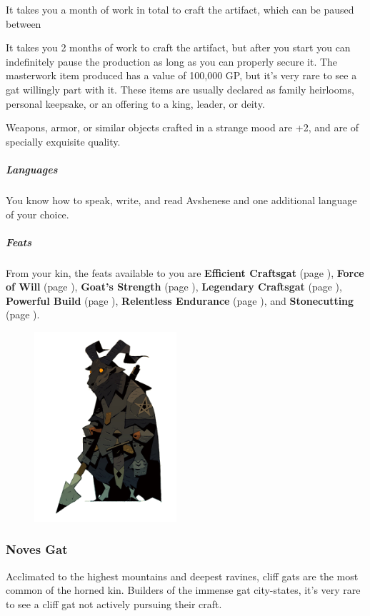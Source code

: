     It takes you a month of work in total to craft the artifact, which can be paused between

    It takes you 2 months of work to craft the artifact, but after you start you can indefinitely pause the production as long as you can properly secure it.
    The masterwork item produced has a value of 100,000 GP, but it's very rare to see a gat willingly part with it.
    These items are usually declared as family heirlooms, personal keepsake, or an offering to a king, leader, or deity.

    Weapons, armor, or similar objects crafted in a strange mood are +2, and are of specially exquisite quality.

    \subparagraph{Languages} You know how to speak, write, and read Avshenese and one additional language of your choice.

    \subparagraph{Feats} From your kin, the feats available to you are
    \textbf{Efficient Craftsgat} (page \pageref{feat::efficientcraftsgat}),
    \textbf{Force of Will} (page \pageref{feat::forceofwill}),
    \textbf{Goat's Strength} (page \pageref{feat::goatsstrength}),
    \textbf{Legendary Craftsgat} (page \pageref{feat::legendarycraftsgat}),
    \textbf{Powerful Build} (page \pageref{feat::powerfulbuild}),
    \textbf{Relentless Endurance} (page \pageref{feat::relentlessendurance}), and
    \textbf{Stonecutting} (page \pageref{feat::stonecutting}).

\begin{figure}[!b]
    \centering
    \includegraphics[width=0.47\textwidth]{04kins/img/11gat_knight.png}
\end{figure}

\newpage

\subsubsection{Noves Gat}
    Acclimated to the highest mountains and deepest ravines, cliff gats are the most common of the horned kin.
    Builders of the immense gat city-states, it's very rare to see a cliff gat not actively pursuing their craft.

